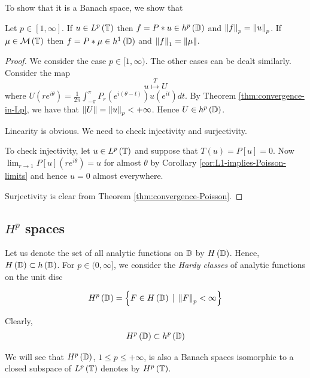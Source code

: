 To show that it is a Banach space, we show that

\begin{theorem}
    Let $p\in [1, \infty]$. If $u\in L^{p} \left( \mathbb T \right)$ then $f=P * u \in h^{p} \left( \mathbb D \right)$ and $\left\lVert f \right\rVert_{p} =\left\lVert u \right\rVert_{p}$. If $\mu \in {\cal M} \left( \mathbb T \right)$ then $f= P * \mu \in h^{1} \left( \mathbb D \right)$ and $\left\lVert f \right\rVert_{1} = \left\lVert \mu \right\rVert$.
    \label{thm:lp-and-hp}
\end{theorem}
\begin{proof}
    We consider the case $p \in [1, \infty )$. The other cases can be dealt similarly. Consider the map 
    \begin{equation*}
	u \stackrel{T}{\mapsto} U
    \end{equation*}
    where $U\left( re^{i\theta} \right) = \frac{1}{2\pi} \int_{-\pi}^{\pi} P_{r}\left( e^{i(\theta-t)} \right) u \left( e^{it} \right) dt$. By Theorem \ref{thm:convergence-in-Lp}, we have that $\left\lVert U \right\rVert = \left\lVert u \right\rVert_{p} < +\infty$. Hence $U \in h^{p} \left( \mathbb D \right)$.

    Linearity is obvious. We need to check injectivity and surjectivity.

    To check injectivity, let $u \in L^{p} \left( \mathbb T \right)$ and suppose that $T(u)=P[u]=0$. Now $\lim_{r\to 1} P[u] \left( re^{i\theta} \right) = u$ for almost $\theta$ by Corollary \ref{cor:L1-implies-Poisson-limits} and hence $u=0$ almost everywhere.

    Surjectivity is clear from Theorem \ref{thm:convergence-Poisson}.
    \end{proof}


\subsection{\texorpdfstring{$H^p$}{} spaces}

Let us denote the set of all analytic functions on $\mathbb D$ by $H \left( \mathbb D \right)$. Hence, $H \left( \mathbb D \right) \subset h \left( \mathbb D \right)$. For $p\in (0,\infty]$, we consider the \textit{Hardy classes} of analytic functions on the unit disc

\begin{equation*}
    H^{p} \left( \mathbb D \right) = \left\{ F \in H \left( \mathbb D \right) \, \mid \, \left\lVert F \right\rVert _{p} < \infty \right\}
\end{equation*}

Clearly, 
\begin{align*}
    H^{p} \left( \mathbb D \right) \subset h ^{p} \left( \mathbb D \right)
\end{align*}

We will see that $H ^{p} \left( \mathbb D \right)$, $1\le p \le +\infty$, is also a Banach spaces isomorphic to a closed subspace of $L^{p} \left( \mathbb T \right)$ denotes by $H^{p} \left( \mathbb T \right)$.
